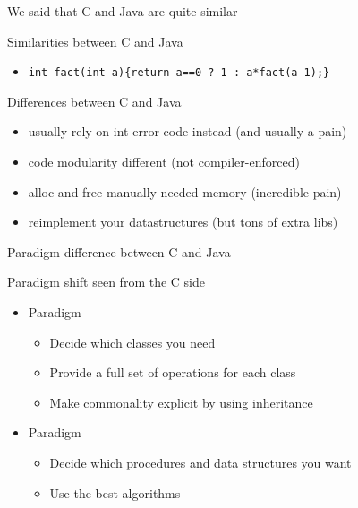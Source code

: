 \begin{Coupe}
\begin{frame}{We said that C and Java are quite similar}
\begin{block}{Similarities between C and Java}
\begin{itemize}
    \item {} \texttt{\small int fact(int a)\{return a==0 ? 1 : a*fact(a-1);\}}
    \end{itemize}
  \end{block}\vspace{-\baselineskip}

  \begin{block}{Differences between C and Java}
    \begin{itemize}
    \item {} usually rely on int error code instead 
      {\small(and usually a pain)}
    \item {} code modularity different
      {\small(not compiler-enforced)}
    \item {} alloc and free manually needed
      memory {\small(incredible pain)}
    \item {} reimplement your datastructures
      {\small(but tons of extra libs)}
    \end{itemize}
  \end{block}
\end{frame}
\begin{frame}{Paradigm difference between C and Java}

  \begin{block}{Paradigm shift seen from the C side}
    \begin{itemize}
    \item {} Paradigm
      \begin{itemize}
      \item Decide which classes you need
      \item Provide a full set of operations for each class
      \item Make commonality explicit by using inheritance
      \end{itemize}

    \item {} Paradigm
      \begin{itemize}
      \item Decide which procedures and data structures you want
      \item Use the best algorithms
      \end{itemize}
    \end{itemize}
  \end{block}



\end{frame}
\end{Coupe}
